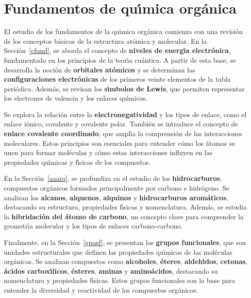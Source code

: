 \chapter[Fundamentos de quimica org\'anica]{Fundamentos de qu\'{\i}mica org\'anica}
El estudio de los fundamentos de la qu\'{\i}mica org\'anica comienza con una revisi\'on de los conceptos b\'asicos de la estructura at\'omica y molecular. En la  Secci\'on~\ref{cfund}, se aborda el concepto de \textbf{niveles de energ\'{\i}a electr\'onica}, fundamentado en los principios de la teor\'{\i}a cu\'antica. A partir de esta base, se desarrolla la noci\'on de \textbf{orbitales at\'omicos} y se determinan las \textbf{configuraciones electr\'onicas} de los primeros veinte elementos de la tabla peri\'odica. Adem\'as, se revisan los \textbf{s\'{\i}mbolos de Lewis}, que permiten representar los electrones de valencia y los enlaces qu\'{\i}micos.

Se explora la relaci\'on entre la \textbf{electronegatividad} y los tipos de enlace, como el enlace i\'onico, covalente y covalente polar. Tambi\'en se introduce el concepto de \textbf{enlace covalente coordinado}, que ampl\'{\i}a la comprensi\'on de las interacciones moleculares. Estos principios son esenciales para entender c\'omo los \'atomos se unen para formar mol\'eculas y c\'omo estas interacciones influyen en las propiedades qu\'{\i}micas y f\'{\i}sicas de los compuestos.

En la Secci\'on~\ref{aaaro}, se profundiza en el estudio de los \textbf{hidrocarburos}, compuestos org\'anicos formados principalmente por carbono e hidr\'ogeno. Se analizan los \textbf{alcanos}, \textbf{alquenos}, \textbf{alquinos} y \textbf{hidrocarburos arom\'aticos}, destacando su estructura, propiedades f\'{\i}sicas y nomenclatura. Adem\'as, se estudia la \textbf{hibridaci\'on del \'atomo de carbono}, un concepto clave para comprender la geometr\'{\i}a molecular y los tipos de enlaces carbono-carbono.

Finalmente, en la Secci\'on~\ref{gposf}, se presentan los \textbf{grupos funcionales}, que son unidades estructurales que definen las propiedades qu\'{\i}micas de las mol\'eculas org\'anicas. Se analizan compuestos como \textbf{alcoholes}, \textbf{\'eteres}, \textbf{aldeh\'{\i}dos}, \textbf{cetonas}, \textbf{\'acidos carbox\'{\i}licos}, \textbf{\'esteres}, \textbf{aminas} y \textbf{amino\'acidos}, destacando su nomenclatura y propiedades f\'{\i}sicas. Estos grupos funcionales son la base para entender la diversidad y reactividad de los compuestos org\'anicos.

